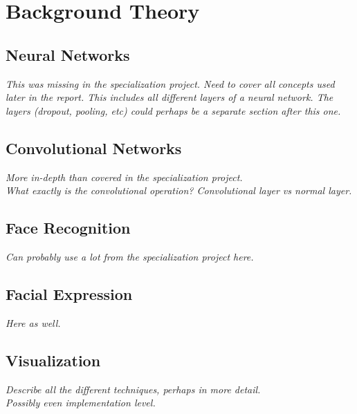 
\chapter{Background Theory}

\section{Neural Networks}

\textit{This was missing in the specialization project. Need to cover all concepts used later in the report. This includes all different layers of a neural network. The layers (dropout, pooling, etc) could perhaps be a separate section after this one.}

\section{Convolutional Networks}

\textit{More in-depth than covered in the specialization project. \\
What exactly is the convolutional operation? Convolutional layer vs normal layer.}

\section{Face Recognition}

\textit{Can probably use a lot from the specialization project here.}

\section{Facial Expression}

\textit{Here as well.}

\section{Visualization}

\textit{Describe all the different techniques, perhaps in more detail. \\
Possibly even implementation level.}

\cleardoublepage
